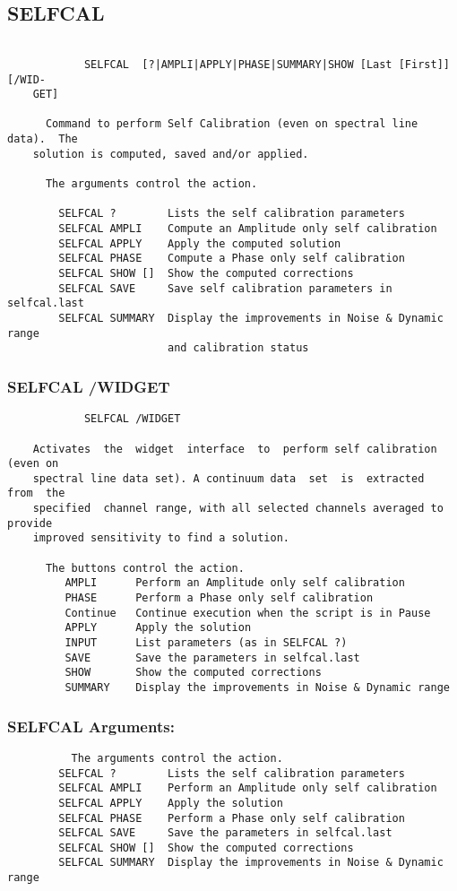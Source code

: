 \subsection{SELFCAL}
\begin{verbatim}

            SELFCAL  [?|AMPLI|APPLY|PHASE|SUMMARY|SHOW [Last [First]] [/WID-
    GET]

      Command to perform Self Calibration (even on spectral line data).  The
    solution is computed, saved and/or applied.

      The arguments control the action.

        SELFCAL ?        Lists the self calibration parameters
        SELFCAL AMPLI    Compute an Amplitude only self calibration
        SELFCAL APPLY    Apply the computed solution
        SELFCAL PHASE    Compute a Phase only self calibration
        SELFCAL SHOW []  Show the computed corrections
        SELFCAL SAVE     Save self calibration parameters in selfcal.last
        SELFCAL SUMMARY  Display the improvements in Noise & Dynamic range
                         and calibration status
\end{verbatim}
\subsubsection{SELFCAL /WIDGET}
\begin{verbatim}
            SELFCAL /WIDGET

    Activates  the  widget  interface  to  perform self calibration (even on
    spectral line data set). A continuum data  set  is  extracted  from  the
    specified  channel range, with all selected channels averaged to provide
    improved sensitivity to find a solution.

      The buttons control the action.
         AMPLI      Perform an Amplitude only self calibration
         PHASE      Perform a Phase only self calibration
         Continue   Continue execution when the script is in Pause
         APPLY      Apply the solution
         INPUT      List parameters (as in SELFCAL ?)
         SAVE       Save the parameters in selfcal.last
         SHOW       Show the computed corrections
         SUMMARY    Display the improvements in Noise & Dynamic range
\end{verbatim}
\subsubsection{SELFCAL Arguments:}
\begin{verbatim}
          The arguments control the action.
        SELFCAL ?        Lists the self calibration parameters
        SELFCAL AMPLI    Perform an Amplitude only self calibration
        SELFCAL APPLY    Apply the solution
        SELFCAL PHASE    Perform a Phase only self calibration
        SELFCAL SAVE     Save the parameters in selfcal.last
        SELFCAL SHOW []  Show the computed corrections
        SELFCAL SUMMARY  Display the improvements in Noise & Dynamic range
\end{verbatim}

